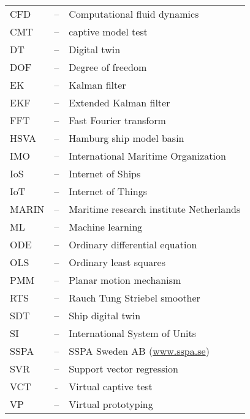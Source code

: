 
\begin{tabular}{ l c l }
CFD & -- & Computational fluid dynamics\\
CMT & -- & captive model test \\
DT  & -- & Digital twin\\
DOF & -- & Degree of freedom\\
EK & -- & Kalman filter \\
EKF & -- & Extended Kalman filter \\
FFT & -- & Fast Fourier transform\\
HSVA & -- & Hamburg ship model basin \\
IMO & -- & International Maritime Organization \\
IoS & -- & Internet of Ships \\
IoT & -- & Internet of Things \\
MARIN & -- & Maritime research institute Netherlands \\
ML & -- & Machine learning \\
ODE & -- & Ordinary differential equation\\
OLS & -- & Ordinary least squares\\
PMM & -- & Planar motion mechanism \\ 
RTS & -- & Rauch Tung Striebel smoother \\
SDT  & -- & Ship digital twin\\
SI  & -- & International System of Units\\
SSPA & -- & SSPA Sweden AB (\url{www.sspa.se})\\
SVR & -- & Support vector regression \\
VCT & - & Virtual captive test \\
VP & -- & Virtual prototyping \\
\end{tabular}
